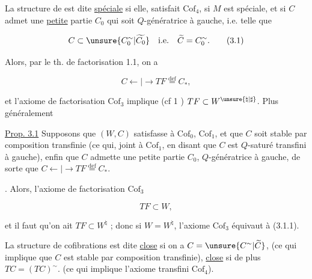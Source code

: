 La structure de  est dite
\uline{spéciale} si elle,  satisfait $\mathrm{Cof}_4$,
si $M$ est spéciale, et si $C$ admet
une \uline{petite} partie $C_0$ qui soit $Q$-génératrice
à gauche, i.e. telle que

\[
 C\subset \unsure{C_0^{\sim}|\widetilde{C_0}}\quad\text{i.e.}\quad\widetilde C=C_0^{\sim}.\tag*{(3.1)}
\]

Alors, par le th. de factorisation 1.1, on a

\[
 C\mathrel{\leftarrow\!\!|\!\!\rightarrow}TF\overset{\mathrm{def}}{=}C_*,
\]

et l'axiome de factorisation $\mathrm{Cof}_3$ implique
(cf 1 ) $TF\subset W^{\unsure{\natural|\sharp}}$. Plus généralement

\uline{Prop. 3.1} Supposons  que  $(W,C)$ satisfasse
à $\mathrm{Cof}_0$, $\mathrm{Cof}_1$, et que $C$ soit stable par
composition transfinie (ce qui, joint à $\mathrm{Cof}_1$,
 en disant que $C$ est $Q$-saturé
transfini à gauche), enfin que $C$
admette une petite partie $C_0$, $Q$-génératrice
à gauche, de sorte que $C\mathrel{\leftarrow\!\!|\!\!\rightarrow}TF\overset{\mathrm{def}}{=}C_*$.

. Alors,  l'axiome de
factorisation $\mathrm{Cof}_3$ 

\[
 TF\subset W,\tag*{(3.1.1)}
\]

et il faut qu'on ait $TF\subset W^{\natural}$ ; donc si $W=W^{\natural}$,
l'axiome $\mathrm{Cof}_3$ équivaut à (3.1.1).

La structure de cofibrations est dite \uline{close}
si  on a $C=\unsure{C^{\sim}|\widetilde C}$, (ce qui implique
que $C$ est stable par composition transfinie),
\uline{close} si de plus $TC=(TC)^{\sim}$. (ce qui
implique l'axiome transfini $\mathrm{Cof}_4$).

